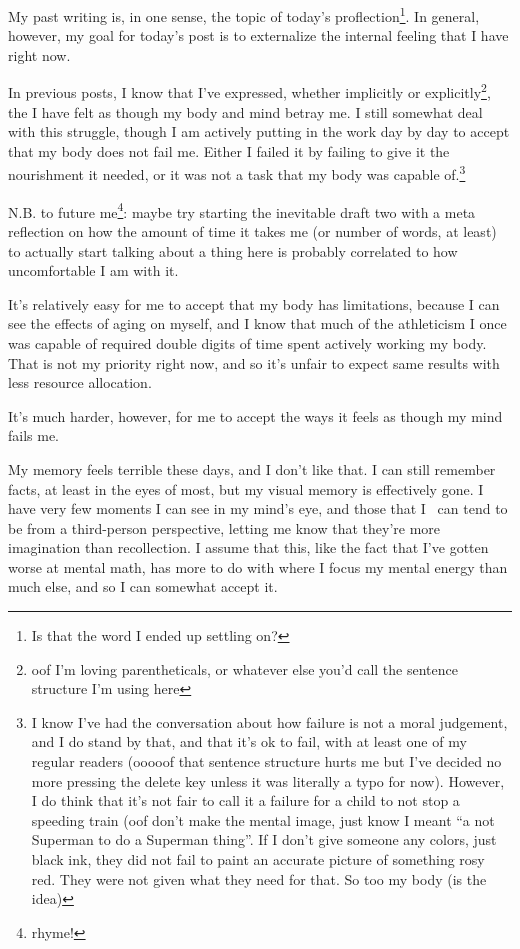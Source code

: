\documentclass[12pt]{article}
\newcommand{\say}[1]{``#1''}
\renewcommand{\,}{\textsuperscript{,}}
\begin{document}
My past writing is, in one sense, the topic of today's proflection\footnote{Is that the word I ended up settling on?}.  
In general, however, my goal for today's post is to externalize the internal feeling that I have right now.

In previous posts, I know that I've expressed, whether implicitly or explicitly\footnote{oof I'm loving parentheticals, or whatever else you'd call the sentence structure I'm using here}, the I have felt as though my body and mind betray me.  
I still somewhat deal with this struggle, though I am actively putting in the work day by day to accept that my body does not fail me.  
Either I failed it by failing to give it the nourishment it needed, or it was not a task that my body was capable of.\footnote{I know I've had the conversation about how failure is not a moral judgement, and I do stand by that, and that it's ok to fail, with at least one of my regular readers (ooooof that sentence structure hurts me but I've decided no more pressing the delete key unless it was literally a typo for now). However, I do think that it's not fair to call it a failure for a child to not stop a speeding train (oof don't make the mental image, just know I meant \say{a not Superman to do a Superman thing}. If I don't give someone any colors, just black ink, they did not fail to paint an accurate picture of something rosy red. They were not given what they need for that. So too my body (is the idea)}

N.B. to future me\footnote{rhyme!}: maybe try starting the inevitable draft two with a meta reflection on how the amount of time it takes me (or number of words, at least) to actually start talking about a thing here is probably correlated to how uncomfortable I am with it.

It's relatively easy for me to accept that my body has limitations, because I can see the effects of aging on myself, and I know that much of the athleticism I once was capable of required double digits of time spent actively working my body.  
That is not my priority right now, and so it's unfair to expect same results with less resource allocation.

It's much harder, however, for me to accept the ways it feels as though my mind fails me.

My memory feels terrible these days, and I don't like that.  
I can still remember facts, at least in the eyes of most, but my visual memory is effectively gone.  
I have very few moments I can see in my mind's eye, and those that I  can tend to be from a third-person perspective, letting me know that they're more imagination than recollection.  
I assume that this, like the fact that I've gotten worse at mental math, has more to do with where I focus my mental energy than much else, and so I can somewhat accept it.
\end{document}
